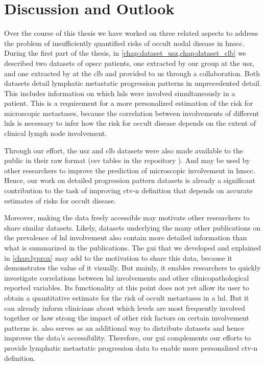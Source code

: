 \documentclass[\relativeRoot/main.tex]{subfiles}
\begin{document}
\chapter{Discussion and Outlook}
\label{chap:discussion}

Over the course of this thesis we have worked on three related aspects to address the problem of insufficiently quantified risks of occult nodal disease in \gls{hnscc}. During the first part of the thesis, in \cref{chap:dataset_usz,chap:dataset_clb} we described two datasets of \gls{opscc} patients, one extracted by our group at the \gls{usz}, and one extracted by  at the \gls{clb} and provided to us through a collaboration. Both datasets detail lymphatic metastatic progression patterns in unprecedented detail. This includes information on which \glspl{lnl} were involved simultaneously in a patient. This is a requirement for a more personalized estimation of the risk for microscopic metastases, because the correlation between involvements of different \glspl{lnl} is necessary to infer how the risk for occult disease depends on the extent of clinical lymph node involvement.

Through our effort, the \gls{usz} and \gls{clb} datasets were also made available to the public in their raw format (\acrshort{csv} tables in the repository ). And may be used by other researchers to improve the prediction of microscopic involvement in \gls{hnscc}. Hence, our work on detailed progression pattern datasets is already a significant contribution to the task of improving \gls{ctv-n} definition that depends on accurate estimates of risks for occult disease.

Moreover, making the data freely accessible may motivate other researchers to share similar datasets. Likely, datasets underlying the many other publications on the prevalence of \gls{lnl} involvement \cite{candela_patterns_1990,shah_patterns_1990,woolgar_histological_1999,woolgar_topography_2007,chao_determination_2002,vauterin_patterns_2006,razfar_incidence_2009,ho_patterns_2012,bauwens_prevalence_2021} also contain more detailed information than what is summarized in the publications. The \gls{gui}  that we developed and explained in \cref{chap:lyprox} may add to the motivation to share this data, because it demonstrates the value of it visually. But mainly, it enables researchers to quickly investigate correlations between \gls{lnl} involvements and other clinicopathological reported variables. Its functionality at this point does not yet allow its user to obtain a quantitative estimate for the risk of occult metastases in a \gls{lnl}. But it can already inform clinicians about which levels are most frequently involved together or how strong the impact of other risk factors on certain involvement patterns is.  also serves as an additional way to distribute datasets and hence improves the data's accessibility. Therefore, our \gls{gui} complements our efforts to provide lymphatic metastatic progression data to enable more personalized \gls{ctv-n} definition.
\end{document}

